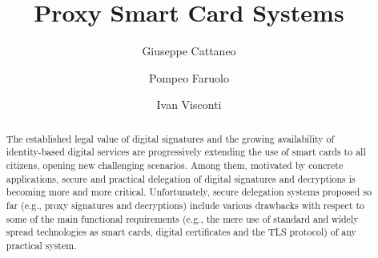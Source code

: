 \documentclass[preprint,authoryear,12pt]{elsarticle}
\begin{document}
\begin{frontmatter}



\title{Proxy Smart Card Systems}


\author[dia]{  Giuseppe Cattaneo   }
\author[dia]{   Pompeo Faruolo   }
\author[dia]{   Ivan Visconti  }


\address[dia]{
Dipartimento di Informatica ed Applicazioni  "R.M. Capocelli",\\
Universit\`{a} di Salerno,\\
Via Ponte don Melillo, I-84081 Fisciano (SA), Italy\\}


\begin{abstract}
The established legal value of digital signatures and the growing availability of identity-based digital services are progressively extending the use of smart cards to all citizens, opening new challenging scenarios.  Among them, motivated by concrete applications, secure and practical delegation of digital signatures and decryptions is becoming more and more critical. Unfortunately, secure delegation systems proposed so far (e.g., proxy signatures and decryptions)  include various drawbacks with respect to some of the main functional requirements (e.g., the mere use of standard and widely spread technologies as smart cards, digital certificates and the TLS protocol) of any practical system.


\end{abstract}
\end{frontmatter}
\end{document}
